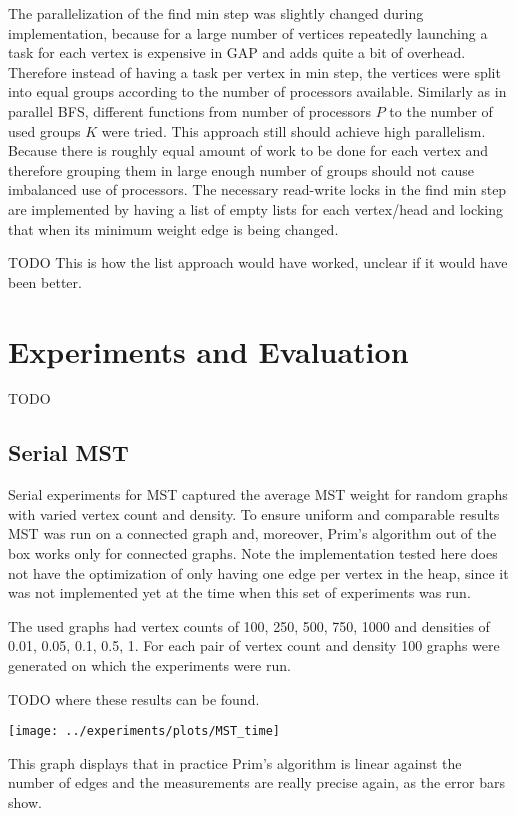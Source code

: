 \documentclass{report}
\theoremstyle{plain}
\theoremstyle{definition}
\theoremstyle{remark}
\begin{document}
The parallelization of the find min step was slightly changed during implementation, because for a large number of vertices repeatedly launching a task for each vertex is expensive in GAP and adds quite a bit of overhead. Therefore instead of having a task per vertex in min step, the vertices were split into equal groups according to the number of processors available. Similarly as in parallel BFS, different functions from number of processors $P$ to the number of used groups $K$ were tried.
This approach still should achieve high parallelism. Because there is roughly equal amount of work to be done for each vertex and therefore grouping them in large enough number of groups should not cause imbalanced use of processors. The necessary read-write locks in the find min step are implemented by having a list of empty lists for each vertex/head and locking that when its minimum weight edge is being changed.

TODO This is how the list approach would have worked, unclear if it would have been better.

\section{Experiments and Evaluation}

TODO

\subsection{Serial MST}

Serial experiments for MST captured the average MST weight for random graphs with varied vertex count and density. To ensure uniform and comparable results MST was run on a connected graph and, moreover, Prim's algorithm out of the box works only for connected graphs. Note the implementation tested here does not have the optimization of only having one edge per vertex in the heap, since it was not implemented yet at the time when this set of experiments was run.

The used graphs had vertex counts of 100, 250, 500, 750, 1000 and densities of 0.01, 0.05, 0.1, 0.5, 1. For each pair of vertex count and density 100 graphs were generated on which the experiments were run.

TODO where these results can be found.

\texttt{[image: ../experiments/plots/MST\_time]}

This graph displays that in practice Prim's algorithm is linear against the number of edges and the measurements are really precise again, as the error bars show.
\end{document}
